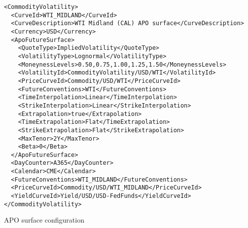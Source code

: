 \begin{longlisting}
\begin{verbatim}
<CommodityVolatility>
  <CurveId>WTI_MIDLAND</CurveId>
  <CurveDescription>WTI Midland (CAL) APO surface</CurveDescription>
  <Currency>USD</Currency>
  <ApoFutureSurface>
    <QuoteType>ImpliedVolatility</QuoteType>
    <VolatilityType>Lognormal</VolatilityType>
    <MoneynessLevels>0.50,0.75,1.00,1.25,1.50</MoneynessLevels>
    <VolatilityId>CommodityVolatility/USD/WTI</VolatilityId>
    <PriceCurveId>Commodity/USD/WTI</PriceCurveId>
    <FutureConventions>WTI</FutureConventions>
    <TimeInterpolation>Linear</TimeInterpolation>
    <StrikeInterpolation>Linear</StrikeInterpolation>
    <Extrapolation>true</Extrapolation>
    <TimeExtrapolation>Flat</TimeExtrapolation>
    <StrikeExtrapolation>Flat</StrikeExtrapolation>
    <MaxTenor>2Y</MaxTenor>
    <Beta>0</Beta>
  </ApoFutureSurface>
  <DayCounter>A365</DayCounter>
  <Calendar>CME</Calendar>
  <FutureConventions>WTI_MIDLAND</FutureConventions>
  <PriceCurveId>Commodity/USD/WTI_MIDLAND</PriceCurveId>
  <YieldCurveId>Yield/USD/USD-FedFunds</YieldCurveId>
</CommodityVolatility>
\end{verbatim}
\caption{APO surface configuration}
\label{lst:comm_vol_apo_surface_config}
\end{longlisting}

